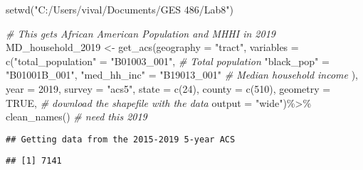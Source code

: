 \documentclass[
]{article}
\newenvironment{Shaded}{\begin{snugshade}}{\end{snugshade}}
\newcommand{\AttributeTok}[1]{\textcolor[rgb]{0.77,0.63,0.00}{#1}}
\newcommand{\CommentTok}[1]{\textcolor[rgb]{0.56,0.35,0.01}{\textit{#1}}}
\newcommand{\ConstantTok}[1]{\textcolor[rgb]{0.00,0.00,0.00}{#1}}
\newcommand{\DecValTok}[1]{\textcolor[rgb]{0.00,0.00,0.81}{#1}}
\newcommand{\FunctionTok}[1]{\textcolor[rgb]{0.00,0.00,0.00}{#1}}
\newcommand{\NormalTok}[1]{#1}
\newcommand{\OtherTok}[1]{\textcolor[rgb]{0.56,0.35,0.01}{#1}}
\newcommand{\SpecialCharTok}[1]{\textcolor[rgb]{0.00,0.00,0.00}{#1}}
\newcommand{\StringTok}[1]{\textcolor[rgb]{0.31,0.60,0.02}{#1}}
\begin{document}
\begin{Shaded}
\begin{Highlighting}[]
\FunctionTok{setwd}\NormalTok{(}\StringTok{"C:/Users/vival/Documents/GES 486/Lab8"}\NormalTok{)}


\CommentTok{\# This gets African American Population and MHHI in 2019}
\NormalTok{MD\_household\_2019 }\OtherTok{\textless{}{-}} \FunctionTok{get\_acs}\NormalTok{(}\AttributeTok{geography =} \StringTok{"tract"}\NormalTok{, }
     \AttributeTok{variables =} \FunctionTok{c}\NormalTok{(}\StringTok{"total\_population"} \OtherTok{=} \StringTok{"B01003\_001"}\NormalTok{, }\CommentTok{\# Total population}
                   \StringTok{"black\_pop"} \OtherTok{=} \StringTok{"B01001B\_001"}\NormalTok{,}
                   \StringTok{"med\_hh\_inc"} \OtherTok{=} \StringTok{"B19013\_001"} \CommentTok{\# Median household income}
\NormalTok{                   ), }
     \AttributeTok{year =} \DecValTok{2019}\NormalTok{,}
     \AttributeTok{survey =} \StringTok{"acs5"}\NormalTok{,}
     \AttributeTok{state =} \FunctionTok{c}\NormalTok{(}\DecValTok{24}\NormalTok{), }
     \AttributeTok{county =} \FunctionTok{c}\NormalTok{(}\DecValTok{510}\NormalTok{),}
     \AttributeTok{geometry =} \ConstantTok{TRUE}\NormalTok{, }\CommentTok{\# download the shapefile with the data}
     \AttributeTok{output =} \StringTok{"wide"}\NormalTok{)}\SpecialCharTok{\%\textgreater{}\%} \FunctionTok{clean\_names}\NormalTok{() }\CommentTok{\# need this 2019}
\end{Highlighting}
\end{Shaded}

\begin{verbatim}
## Getting data from the 2015-2019 5-year ACS
\end{verbatim}

\begin{Shaded}
\end{Shaded}

\begin{verbatim}
## [1] 7141
\end{verbatim}
\end{document}
